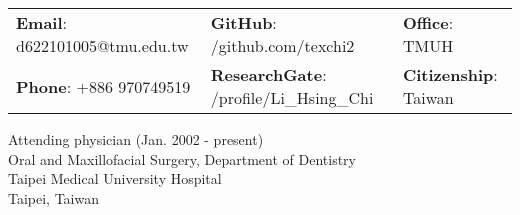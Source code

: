 \documentclass[letterpaper, 11pt]{article}
\begin{document}


\vspace{0.5cm} 
\begin{center}
\begin{tabular}{lll}
\textbf{Email}: d622101005@tmu.edu.tw      &
\hspace{0.2cm} \textbf{GitHub}: /github.com/texchi2    &
\hspace{0.2cm} 	\textbf{Office}: TMUH \\

\textbf{Phone}: +886 970749519   & 
\hspace{0.2cm} \textbf{ResearchGate}: 
/profile/Li\_Hsing\_Chi &
\hspace{0.2cm} \textbf{Citizenship}: Taiwan 
\end{tabular}
\end{center}

\noindent
Attending physician (Jan. 2002 - present)\\
Oral and Maxillofacial Surgery, Department of Dentistry\\
Taipei Medical University Hospital\\
Taipei, Taiwan\\


\setlength{\tabcolsep}{8pt}
\end{document}
